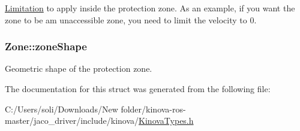 \hyperlink{struct_limitation}{Limitation} to apply inside the protection zone. As an example, if you want the zone to be am unaccessible zone, you need to limit the velocity to 0. 

\subsubsection[{\texorpdfstring{zone\+Shape}{zoneShape}}]{ Zone\+::zone\+Shape}\hypertarget{struct_zone_a918e45dc4df9996faeadd1366130f757}{}\label{struct_zone_a918e45dc4df9996faeadd1366130f757}


Geometric shape of the protection zone. 



The documentation for this struct was generated from the following file\+:\begin{DoxyCompactItemize}
\item 
C\+:/\+Users/soli/\+Downloads/\+New folder/kinova-\/ros-\/master/jaco\+\_\+driver/include/kinova/\hyperlink{_kinova_types_8h}{Kinova\+Types.\+h}\end{DoxyCompactItemize}
